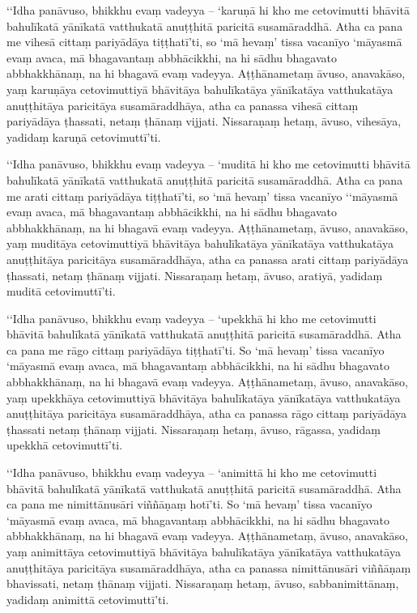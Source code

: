 ‘‘Idha panāvuso, bhikkhu evaṃ vadeyya – ‘karuṇā hi kho me cetovimutti bhāvitā bahulīkatā yānīkatā vatthukatā anuṭṭhitā paricitā susamāraddhā. Atha ca pana me vihesā cittaṃ pariyādāya tiṭṭhatī’ti, so ‘mā hevaṃ’ tissa vacanīyo ‘māyasmā evaṃ avaca, mā bhagavantaṃ abbhācikkhi, na hi sādhu bhagavato abbhakkhānaṃ, na hi bhagavā evaṃ vadeyya. Aṭṭhānametaṃ āvuso, anavakāso, yaṃ karuṇāya cetovimuttiyā bhāvitāya bahulīkatāya yānīkatāya vatthukatāya anuṭṭhitāya paricitāya susamāraddhāya, atha ca panassa vihesā cittaṃ pariyādāya ṭhassati, netaṃ ṭhānaṃ vijjati. Nissaraṇaṃ hetaṃ, āvuso, vihesāya, yadidaṃ karuṇā cetovimuttī’ti.

‘‘Idha panāvuso, bhikkhu evaṃ vadeyya – ‘muditā hi kho me cetovimutti bhāvitā bahulīkatā yānīkatā vatthukatā anuṭṭhitā paricitā susamāraddhā. Atha ca pana me arati cittaṃ pariyādāya tiṭṭhatī’ti, so ‘mā hevaṃ’ tissa vacanīyo ‘‘māyasmā evaṃ avaca, mā bhagavantaṃ abbhācikkhi, na hi sādhu bhagavato abbhakkhānaṃ, na hi bhagavā evaṃ vadeyya. Aṭṭhānametaṃ, āvuso, anavakāso, yaṃ muditāya cetovimuttiyā bhāvitāya bahulīkatāya yānīkatāya vatthukatāya anuṭṭhitāya paricitāya susamāraddhāya, atha ca panassa arati cittaṃ pariyādāya ṭhassati, netaṃ ṭhānaṃ vijjati. Nissaraṇaṃ hetaṃ, āvuso, aratiyā, yadidaṃ muditā cetovimuttī’ti.

‘‘Idha panāvuso, bhikkhu evaṃ vadeyya – ‘upekkhā hi kho me cetovimutti bhāvitā bahulīkatā yānīkatā vatthukatā anuṭṭhitā paricitā susamāraddhā. Atha ca pana me rāgo cittaṃ pariyādāya tiṭṭhatī’ti. So ‘mā hevaṃ’ tissa vacanīyo ‘māyasmā evaṃ avaca, mā bhagavantaṃ abbhācikkhi, na hi sādhu bhagavato abbhakkhānaṃ, na hi bhagavā evaṃ vadeyya. Aṭṭhānametaṃ, āvuso, anavakāso, yaṃ upekkhāya cetovimuttiyā bhāvitāya bahulīkatāya yānīkatāya vatthukatāya anuṭṭhitāya paricitāya susamāraddhāya, atha ca panassa rāgo cittaṃ pariyādāya ṭhassati netaṃ ṭhānaṃ vijjati. Nissaraṇaṃ hetaṃ, āvuso, rāgassa, yadidaṃ upekkhā cetovimuttī’ti.

‘‘Idha panāvuso, bhikkhu evaṃ vadeyya – ‘animittā hi kho me cetovimutti bhāvitā bahulīkatā yānīkatā vatthukatā anuṭṭhitā paricitā susamāraddhā. Atha ca pana me nimittānusāri viññāṇaṃ hotī’ti. So ‘mā hevaṃ’ tissa vacanīyo ‘māyasmā evaṃ avaca, mā bhagavantaṃ abbhācikkhi, na hi sādhu bhagavato abbhakkhānaṃ, na hi bhagavā evaṃ vadeyya. Aṭṭhānametaṃ, āvuso, anavakāso, yaṃ animittāya cetovimuttiyā bhāvitāya bahulīkatāya yānīkatāya vatthukatāya anuṭṭhitāya paricitāya susamāraddhāya, atha ca panassa nimittānusāri viññāṇaṃ bhavissati, netaṃ ṭhānaṃ vijjati. Nissaraṇaṃ hetaṃ, āvuso, sabbanimittānaṃ, yadidaṃ animittā cetovimuttī’ti.

